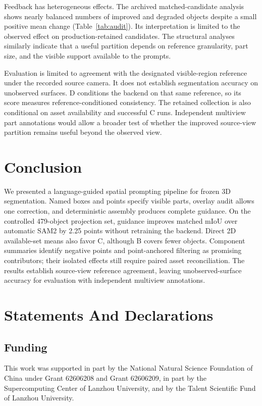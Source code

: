 \documentclass[pdflatex,iicol,sn-apa]{sn-jnl}
\begin{document}
Feedback has heterogeneous effects. The archived matched-candidate analysis shows nearly balanced numbers of improved and degraded objects despite a small positive mean change (Table~\ref{tab:audit}). Its interpretation is limited to the observed effect on production-retained candidates. The structural analyses similarly indicate that a useful partition depends on reference granularity, part size, and the visible support available to the prompts.

Evaluation is limited to agreement with the designated visible-region reference under the recorded source camera. It does not establish segmentation accuracy on unobserved surfaces. D conditions the backend on that same reference, so its score measures reference-conditioned consistency. The retained collection is also conditional on asset availability and successful C runs. Independent multiview part annotations would allow a broader test of whether the improved source-view partition remains useful beyond the observed view.

\section{Conclusion}
\label{sec:conclusion}
We presented a language-guided spatial prompting pipeline for frozen 3D segmentation. Named boxes and points specify visible parts, overlay audit allows one correction, and deterministic assembly produces complete guidance. On the controlled 479-object projection set, guidance improves matched mIoU over automatic SAM2 by 2.25 points without retraining the backend. Direct 2D available-set means also favor C, although B covers fewer objects. Component summaries identify negative points and point-anchored filtering as promising contributors; their isolated effects still require paired asset reconciliation. The results establish source-view reference agreement, leaving unobserved-surface accuracy for evaluation with independent multiview annotations.

\FloatBarrier
\backmatter
\section*{Statements And Declarations}
\subsection*{Funding}
This work was supported in part by the National Natural Science Foundation of China under Grant 62606208 and Grant 62606209, in part by the Supercomputing Center of Lanzhou University, and by the Talent Scientific Fund of Lanzhou University.
\end{document}
